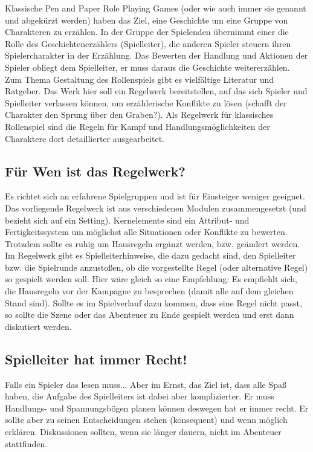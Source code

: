 \documentclass{article}
\begin{document}
Klassische Pen and Paper Role Playing Games (oder wie auch immer sie genannt und abgekürzt werden) haben das Ziel,
eine Geschichte um eine Gruppe von Charakteren zu erzählen. In der Gruppe der Spielenden übernimmt einer die Rolle
des Geschichtenerzählers (Spielleiter), die anderen Spieler steuern ihren Spielercharakter in der Erzählung. Das
Bewerten der Handlung und Aktionen der Spieler obliegt dem Spielleiter, er muss daraus die Geschichte weitererzählen.
Zum Thema Gestaltung des Rollenspiels gibt es vielfältige Literatur und Ratgeber. Das Werk hier soll ein Regelwerk
bereitstellen, auf das sich Spieler und Spielleiter verlassen können, um erzählerische Konflikte zu lösen (schafft
der Charakter den Sprung über den Graben?). Als Regelwerk für klassisches Rollenspiel sind die Regeln
für Kampf und Handlungsmöglichkeiten der Charaktere dort detaillierter ausgearbeitet.

\begin{center}
\subsection{Für Wen ist das Regelwerk?}
\end{center}

Es richtet sich an erfahrene Spielgruppen und ist für Einsteiger weniger geeignet. Das vorliegende Regelwerk ist aus
verschiedenen Modulen zusammengesetzt (und bezieht sich auf ein Setting). Kernelemente sind ein Attribut- und
Fertigkeitssystem um möglichst alle Situationen oder Konflikte zu bewerten. Trotzdem sollte es ruhig um
Hausregeln ergänzt werden, bzw. geändert werden. Im Regelwerk gibt es Spielleiterhinweise, die dazu gedacht sind, den
Spielleiter bzw. die Spielrunde anzustoßen, ob die vorgestellte Regel (oder alternative Regel) so gespielt werden soll.
Hier wäre gleich so eine Empfehlung: Es empfiehlt sich, die Hausregeln vor der Kampagne zu besprechen (damit alle auf
dem gleichen Stand sind). Sollte es im Spielverlauf dazu kommen, dass eine Regel nicht passt, so sollte die Szene oder
das Abenteuer zu Ende gespielt werden und erst dann diskutiert werden.

\begin{center}
\subsection{Spielleiter hat immer Recht!}
\end{center}

Falls ein Spieler das lesen muss... Aber im Ernst, das Ziel ist, dass alle Spaß haben, die Aufgabe des Spielleiters ist
dabei aber komplizierter. Er muss Handlungs- und Spannungsbögen planen können deswegen hat er immer recht. Er sollte
aber zu seinen Entscheidungen stehen (konsequent) und wenn möglich erklären. Diskussionen sollten, wenn sie länger
dauern, nicht im Abenteuer stattfinden.
\end{document}
